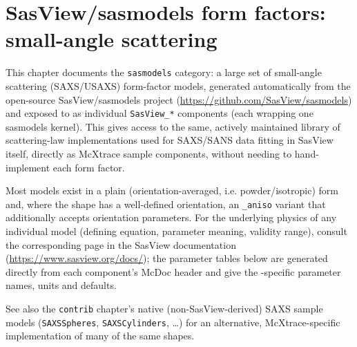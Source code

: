 
\chapter{SasView/sasmodels form factors: small-angle scattering}
\label{c:sasmodels}

This chapter documents the \texttt{sasmodels} category: a large set of
small-angle scattering (SAXS/USAXS) form-factor models, generated
automatically from the open-source SasView/sasmodels project
(\url{https://github.com/SasView/sasmodels}) and exposed to \MCX as
individual \texttt{SasView\_*} components (each wrapping one sasmodels
kernel). This gives
access to the same, actively maintained library of scattering-law
implementations used for SAXS/SANS data fitting in SasView itself,
directly as McXtrace sample components, without needing to hand-implement
each form factor.

Most models exist in a plain (orientation-averaged, i.e. powder/isotropic)
form and, where the shape has a well-defined orientation, an
\texttt{\_aniso} variant that additionally accepts orientation parameters.
For the underlying physics of any individual model (defining equation,
parameter meaning, validity range), consult the corresponding page in the
SasView documentation (\url{https://www.sasview.org/docs/}); the parameter
tables below are generated directly from each component's McDoc header and
give the \MCX-specific parameter names, units and defaults.

See also the \texttt{contrib} chapter's native (non-SasView-derived) SAXS
sample models (\texttt{SAXSSpheres}, \texttt{SAXSCylinders}, \ldots) for an
alternative, McXtrace-specific implementation of many of the same shapes.

